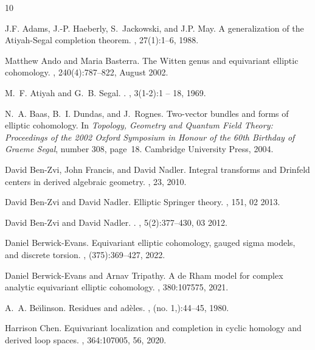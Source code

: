\documentclass[11pt,letterpaper]{amsart}
\begin{document}
\begin{thebibliography}{10}

J.F. Adams, J.-P. Haeberly, S.~Jackowski, and J.P. May.
\newblock A generalization of the {A}tiyah-{S}egal completion theorem.
, 27(1):1--6, 1988.

Matthew Ando and Maria Basterra.
\newblock The {W}itten genus and equivariant elliptic cohomology.
, 240(4):787--822, August 2002.

M.~F. Atiyah and G.~B. Segal.
.
, 3(1-2):1 -- 18, 1969.

N.~A. Baas, B.~I. Dundas, and J.~Rognes.
\newblock Two-vector bundles and forms of elliptic cohomology.
\newblock In {\em Topology, Geometry and Quantum Field Theory: Proceedings of
  the 2002 Oxford Symposium in Honour of the 60th Birthday of Graeme Segal},
  number 308, page~18. Cambridge University Press, 2004.
  
David Ben-Zvi, John Francis, and David Nadler.
\newblock Integral transforms and {Drinfeld} centers in derived algebraic geometry.
, 23,  2010.

David Ben-Zvi and David Nadler.
\newblock Elliptic {S}pringer theory.
, 151, 02 2013.

David Ben-Zvi and David Nadler.
.
, 5(2):377--430, 03 2012.

Daniel Berwick-Evans.
\newblock Equivariant elliptic cohomology, gauged sigma models, and discrete
  torsion.
,
  (375):369--427, 2022.

Daniel Berwick-Evans and Arnav Tripathy.
\newblock A de {R}ham model for complex analytic equivariant elliptic
  cohomology.
, 380:107575, 2021.

A.~A. Be\u{\i}linson.
\newblock Residues and ad\`eles.
, (no. 1,):44--45, 1980.

Harrison Chen.
\newblock Equivariant localization and completion in cyclic homology and
  derived loop spaces.
, 364:107005, 56, 2020.


\end{thebibliography}
\end{document}
